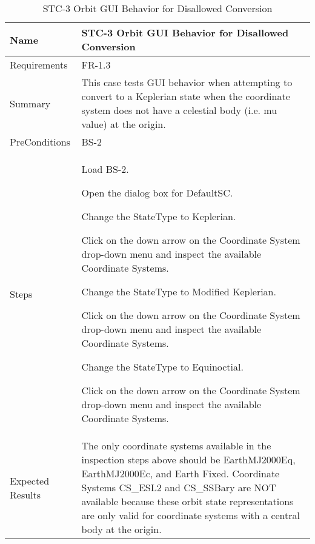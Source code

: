 \begin{table}[htbp!]
\centering
      \begin{tabular}{|p{1.05 in} |p{4.75 in} |}
      \hline
         \rowcolor[rgb]{0.8,0.8,0.8} Name & STC-3 Orbit GUI Behavior for Disallowed Conversion\\
         \hline
         Requirements & FR-1.3\\  \hline
         Summary &
         This  case tests GUI behavior when attempting to convert to a Keplerian state
         when the coordinate system does not have a celestial body (i.e. mu value) at the origin.
         \\     \hline
         PreConditions & BS-2\\     \hline
         Steps &
         \begin{compactenum}
             \item Load BS-2.
             \item Open the dialog box for DefaultSC.
             \item Change the StateType to Keplerian.
             \item Click on the down arrow on the Coordinate System drop-down menu and inspect the available Coordinate Systems.
             \item Change the StateType to Modified Keplerian.
             \item Click on the down arrow on the Coordinate System drop-down menu and inspect the available Coordinate Systems.
             \item Change the StateType to Equinoctial.
             \item Click on the down arrow on the Coordinate System drop-down menu and inspect the available Coordinate Systems.
         \end{compactenum}
         \\ \hline
         Expected Results & The only coordinate systems available in the inspection steps above should be EarthMJ2000Eq, EarthMJ2000Ec, and Earth Fixed.   Coordinate Systems CS\_ESL2  and  CS\_SSBary are NOT available because these orbit state representations are only valid for coordinate systems with a central body at the origin.\\
      \hline
\end{tabular}
      \label{Table: STC-3}
      \caption{STC-3 Orbit GUI Behavior for Disallowed Conversion}
\end{table} 